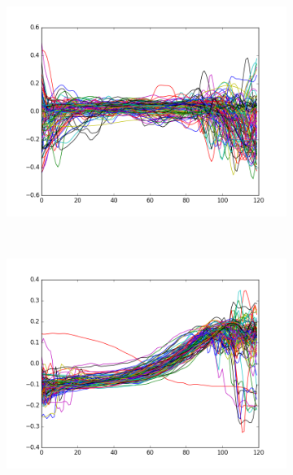 \documentclass[12pt]{article}
\begin{document}
\begin{itemize}
\begin{enumerate}
	\end{enumerate}
\begin{figure}[htb]
	\centering
	\begin{subfigure}[b]{0.49\textwidth}
	    \includegraphics[width=\textwidth]{smooth-0}
	\end{subfigure}
	~
	\begin{subfigure}[b]{0.49\textwidth}
    	\includegraphics[width=\textwidth]{smooth-1}
	\end{subfigure}
	\begin{subfigure}[b]{0.49\textwidth}

\end{subfigure}
\end{figure}
\end{itemize}
\end{document}
